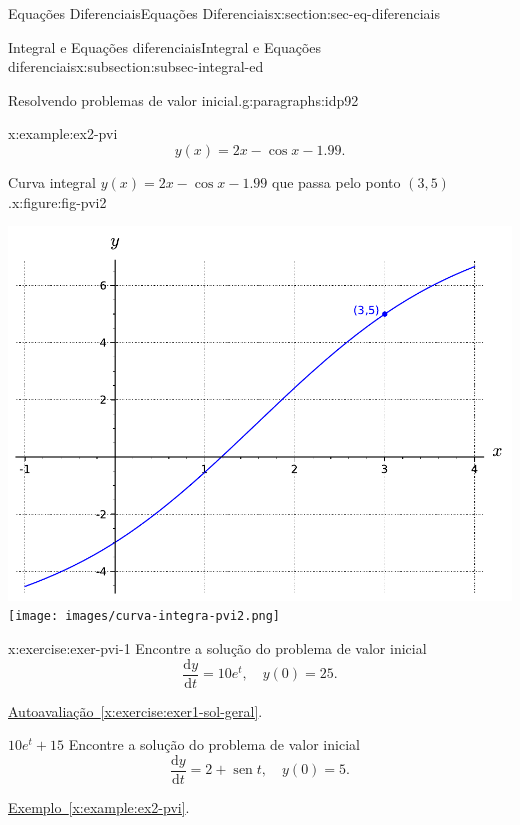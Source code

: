 \documentclass[oneside,10pt,]{article}
\newcommand{\xreffont}{\relax}
\numberwithin{equation}{section}
\newcommand{\dd}{\mathrm{d}}
\DeclareMathOperator{\sin}{sen}
\begin{document}
\begin{sectionptx}{Equações Diferenciais}{}{Equações Diferenciais}{}{}{x:section:sec-eq-diferenciais}
\begin{subsectionptx}{Integral e Equações diferenciais}{}{Integral e Equações diferenciais}{}{}{x:subsection:subsec-integral-ed}
\begin{paragraphs}{Resolvendo problemas de valor inicial.}{g:paragraphs:idp92}
\begin{example}{}{x:example:ex2-pvi}
\begin{equation*}
y(x)= 2x - \cos{x} - 1.99\text{.}
\end{equation*}
\begin{figureptx}{Curva integral \(y(x)= 2x - \cos{x} - 1.99\) que passa pelo ponto \((3,5)\).}{x:figure:fig-pvi2}{}%
\begin{image}{0.25}{0.5}{0.25}%
%
{\includegraphics[width=\linewidth]{images/curva-integra-pvi2.pdf}}%
{\texttt{[image: images/curva-integra-pvi2.png]}}
\end{image}%
\tcblower
\end{figureptx}%
%
\end{example}
\begin{inlineexercise}{}{x:exercise:exer-pvi-1}%
Encontre a solução do problema de valor inicial%
\begin{equation*}
\frac{\dd y}{\dd t}=10e^t, \quad y(0)=25\text{.}
\end{equation*}
%
\par\smallskip%
\noindentRevise \hyperref[x:exercise:exer1-sol-geral]{Autoavaliação~{\xreffont\ref{x:exercise:exer1-sol-geral}}}.%
\par\smallskip%
\noindent\(10e^t + 15\)%
Encontre a solução do problema de valor inicial%
\begin{equation*}
\frac{\dd y}{\dd t} = 2+ \sin{t}, \quad  y(0)=5\text{.}
\end{equation*}
%
\par\smallskip%
\noindentRevise \hyperref[x:example:ex2-pvi]{Exemplo~{\xreffont\ref{x:example:ex2-pvi}}}.%
\par\smallskip%

\end{inlineexercise}
\end{paragraphs}
\end{subsectionptx}
\end{sectionptx}
\end{document}
